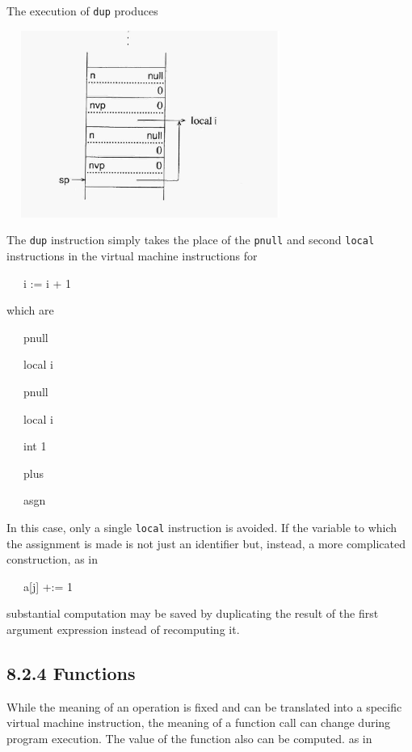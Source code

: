 The execution of \texttt{dup} produces


\ \  \includegraphics[width=3.4193in,height=2.4075in]{ib-img/ib-img056.jpg} 


The \texttt{dup} instruction simply takes the place of the
\texttt{pnull} and second \texttt{local} instructions in the virtual
machine instructions for

{\ttfamily\mdseries
\ \ \ i := i + 1}

which are

{\ttfamily\mdseries
\ \ \ pnull}

{\ttfamily\mdseries
\ \ \ local i}

{\ttfamily\mdseries
\ \ \ pnull}

{\ttfamily\mdseries
\ \ \ local i}

{\ttfamily\mdseries
\ \ \ int 1}

{\ttfamily\mdseries
\ \ \ plus}

{\ttfamily\mdseries
\ \ \ asgn}


In this case, only a single \texttt{local} instruction is avoided. If
the variable to which the assignment is made is not just an identifier
but, instead, a more complicated construction, as in

{\ttfamily\mdseries
\ \ \ a[j] +:= 1}

\noindent substantial computation may be saved by duplicating the
result of the first argument expression instead of recomputing it.

\subsection[8.2.4 Functions]{8.2.4 Functions}

While the meaning of an operation is fixed and can be translated into
a specific virtual machine instruction, the meaning of a function call
can change during program execution. The value of the function also
can be computed. as in

